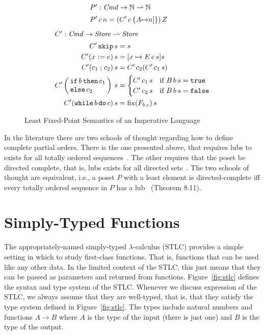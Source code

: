 \documentclass{tufte-handout}
\newcommand{\ASSIGN}[2]{#1 \mathrel{:=} #2}
\newcommand{\SEQ}[2]{#1 \mathrel{;} #2}
\newcommand{\SKIP}[0]{\mathtt{skip}}
\newcommand{\WHILE}[2]{\mathtt{while}\,#1\,\mathtt{do}\,#2}
\newcommand{\TRUE}[0]{\mathtt{true}}
\newcommand{\FALSE}[0]{\mathtt{false}}
\newcommand{\pto}[0]{\rightharpoonup}
\newcommand{\NAT}[0]{\mathbb{N}}
\newcommand{\CMD}[0]{\mathit{Cmd}}
\newcommand{\STORE}[0]{\mathit{Store}}
\begin{document}
\begin{figure}[tbp]
\begin{align*}
  \intertext{$P' : \CMD \to \NAT \pto \NAT$}
  P'\,c\,n &= (C'\,c\,\{A{\mapsto} n]\})\,Z 
\end{align*}
\begin{align*}
  \intertext{$C' : \CMD \to \STORE \pto \STORE$}
C'\,\SKIP\,s &= s \\ 
C'(\ASSIGN{x}{e})\,s &= [x\mapsto E\,e\,s]s\\
C'(\SEQ{c_1}{c_2})\,s &=  C'\,c_2(C'\,c_1\,s) \\
C'\left(\!\!\begin{array}{l}
  \mathtt{if}\,b\,\mathtt{then}\,c_1\\
  \mathtt{else}\,c_2
  \end{array}\!\!\right)\,s
  &= 
 \begin{cases}
  C'\,c_1\,s & \text{if } B\,b\,s = \TRUE \\
  C'\,c_2\,s & \text{if } B\,b\,s = \FALSE
 \end{cases} \\
C'(\WHILE{b}{c})\,s &= \mathrm{fix}(F_{b,c})\,s
\end{align*}
\caption{Least Fixed-Point Semantics of an Imperative Language}
\label{fig:imperative-fixed-point}
\end{figure}

In the literature there are two schools of thought regarding how to
define complete partial orders. There is the one presented above, that
requires lubs to exists for all totally ordered
sequences~\citep{Plotkin:1983aa,Schmidt:1986vn,Winskel:1993uq}.  The
other requires that the poset be directed complete, that is, lubs
exists for all directed
sets~\citep{Gunter:1990aa,Mitchell:1996nn,Amadio:1998fk}.  The two
schools of thought are equivalent, i.e., a poset $P$ with a least
element is directed-complete iff every totally ordered sequence in $P$
has a lub~\citep{Davey:2002fj} (Theorem 8.11).


\section{Simply-Typed Functions}
\label{sec:stlc}


The appropriately-named simply-typed $\lambda$-calculus (STLC)
provides a simple setting in which to study first-class functions.
That is, functions that can be used like any other data.  In the
limited context of the STLC, this just means that they can be passed
as parameters and returned from functions.  Figure~\ref{fig:stlc}
defines the syntax and type system of the STLC. Whenever we discuss
expression of the STLC, we always assume that they are well-typed,
that is, that they satisfy the type system defined in
Figure~\ref{fig:stlc}.  The types include natural numbers and
functions $A \to B$ where $A$ is the type of the input (there is just
one) and $B$ is the type of the output.
\end{document}
